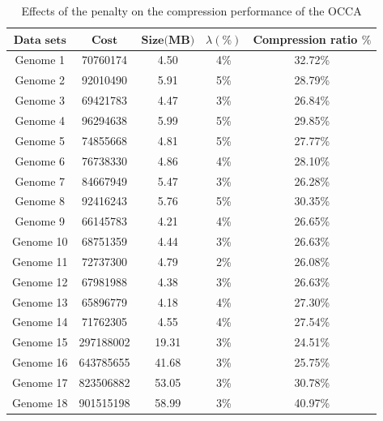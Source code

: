 \documentclass[twocolumn,12pt,a4paper]{article}
\begin{document}
\begin{table}[tpbh]
\small
\renewcommand{\arraystretch}{1.1}
\caption{Effects of  the penalty on the compression performance of the OCCA}
\centering
\begin{tabular}{|c| c| c| c| c| }
\hline
$\textbf{Data sets}$ & $\textbf{Cost}$	& $\textbf{Size(MB)}$ &		\textbf{$\lambda (\%)$} &		\textbf{Compression ratio $\%$} \\\hline
Genome 1 &	 70760174 &4.50& 4\% & 32.72\%\\\hline
Genome 2 &	92010490& 5.91 & 5\%& 28.79\%\\\hline
Genome 3&	69421783& 4.47 &3\%& 26.84\%\\\hline
Genome 4&	96294638& 5.99 & 5\%& 29.85\%\\\hline
Genome 5&	74855668 &4.81& 5\%& 27.77\%\\\hline
Genome 6&	76738330& 4.86  &4\%& 28.10\%\\\hline
Genome 7&	84667949 &5.47& 3\%& 26.28\%\\\hline
Genome 8&	92416243 &5.76& 5\%& 30.35\%\\\hline
Genome 9&	66145783&4.21 & 4\%& 26.65\%\\\hline
Genome 10&	68751359& 4.44 &3\%& 26.63\%\\\hline
Genome 11&	72737300 &4.79& 2\%&26.08\%\\\hline
Genome 12&	67981988 & 4.38&3\%& 26.63\%\\\hline
Genome 13&	65896779& 4.18 &4\%& 27.30\%\\\hline
Genome 14&	71762305 &4.55 &4\%&27.54\% \\\hline
Genome 15&297188002 &19.31 & 3\%& 24.51\%\\\hline
Genome 16&643785655 & 41.68 & 3\%& 25.75\% \\\hline
Genome 17&823506882 & 53.05 & 3\%& 30.78\%\\\hline
Genome 18&901515198 &58.99 & 3\%& 40.97\%\\
\hline
\end{tabular}
\label{table5}
\end{table}
\end{document}
